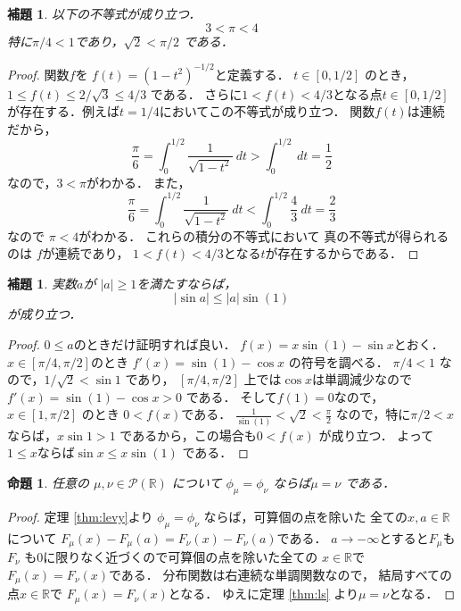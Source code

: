 \documentclass[leqno, 12pt]{jsarticle}
\newtheorem{prop}[thm]{命題}
\newtheorem{lem}[thm]{補題}
\newcommand{\rr}{\mathbb{R}}
\begin{document}
\begin{lem}
以下の不等式が成り立つ．
\[
3<\pi<4
\]
特に$\pi/4<1$であり，$\sqrt{2}<\pi/2$
である．
\end{lem}
\begin{proof}
関数$f$を
$f(t)=(1-t^2)^{-1/2}$と定義する．
$t\in [0, 1/2]$
のとき，
$1\le f(t)\le 2/\sqrt{3}\le 4/3$
である．
さらに$1<f(t)<4/3$となる点$t\in [0, 1/2]$
が存在する．例えば$t=1/4$においてこの不等式が成り立つ．
関数$f(t)$は連続だから，
\[
	\frac{\pi}{6}
	=
	\int_{0}^{1/2}\frac{1}{\sqrt{1-t^2}}\ dt
	>
	\int_{0}^{1/2}\ dt
	=
	\frac{1}{2}
\]
なので，$3<\pi$がわかる．
また，
\[
\frac{\pi}{6}
	=
	\int_{0}^{1/2}\frac{1}{\sqrt{1-t^2}}\ dt
	<\int_{0}^{1/2}\frac{4}{3}\ dt
	=
	\frac{2}{3}
\]
なので
$\pi<4$がわかる．
これらの積分の不等式において
真の不等式が得られるのは
$f$が連続であり，
$1<f(t)<4/3$となる$t$が存在するからである．
\end{proof}

\begin{lem}
実数$a$が
$|a|\ge 1$を満たすならば，
\[
|\sin a|\le |a|\sin (1)
\]
が成り立つ．
\end{lem}
\begin{proof}
$0\le a$のときだけ証明すれば良い．
$f(x)=x\sin (1)-\sin x$とおく．
$x\in [\pi/4, \pi/2]$のとき
$f'(x)=\sin (1)  -\cos x$
の符号を調べる．
$\pi/4<1$
なので，$1/\sqrt{2}<\sin 1$
であり， $ [\pi/4, \pi/2]$
上では$\cos x$は単調減少なので
$f'(x)=\sin (1) -\cos x>0$
である．
そして$f(1)=0$なので，
$x\in [1, \pi/2]$
のとき
$0<f(x)$である．
$\frac{1}{\sin (1)}<\sqrt{2}<\frac{\pi}{2}$
なので，特に$\pi/2<x$ならば，$x\sin 1>1$
であるから，この場合も$0<f(x)$
が成り立つ．
よって$1\le x$ならば$\sin x\le x\sin (1)$
である．
\end{proof}


\begin{prop}\label{prop:equality}
任意の
$\mu, \nu\in \mathcal{P}(\rr)$
について
$\phi_{\mu}=\phi_{\nu}$
ならば$\mu=\nu$
である．
\end{prop}
\begin{proof}
定理 \ref{thm:levy}より
$\phi_{\mu}=\phi_{\nu}$
ならば，可算個の点を除いた
全ての$x, a\in \rr$について
$F_{\mu}(x)-F_{\mu}(a)=F_{\nu}(x)-F_{\nu}(a)$である．
$a\to -\infty$とすると$F_{\mu}$も$F_{\nu}$
も$0$に限りなく近づくので可算個の点を除いた全ての
$x\in \rr$で$F_{\mu}(x)=F_{\nu}(x)$である．
分布関数は右連続な単調関数なので，
結局すべての点$x\in \rr$で
$F_{\mu}(x)=F_{\nu}(x)$となる．
ゆえに定理 \ref{thm:ls}
より$\mu=\nu$となる．
\end{proof}
\end{document}
